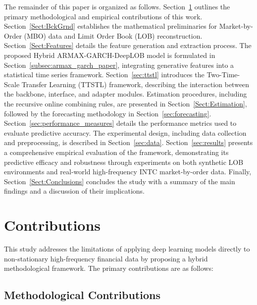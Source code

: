 \documentclass[10pt,a4paper,oneside]{article}
\begin{document}
The remainder of this paper is organized as follows. Section~\ref{Sect:Contributions} outlines the primary methodological and empirical contributions of this work. Section~\ref{Sect:BckGrnd} establishes the mathematical preliminaries for Market-by-Order (MBO) data and Limit Order Book (LOB) reconstruction. Section~\ref{Sect:Features} details the feature generation and extraction process. The proposed Hybrid ARMAX-GARCH-DeepLOB model is formulated in Section~\ref{subsec:armax_garch_paper}, integrating generative features into a statistical time series framework. Section~\ref{sec:ttstl} introduces the Two-Time-Scale Transfer Learning (TTSTL) framework, describing the interaction between the backbone, interface, and adapter modules. Estimation procedures, including the recursive online combining rules, are presented in Section~\ref{Sect:Estimation}, followed by the forecasting methodology in Section~\ref{sec:forecasting}.
Section~\ref{sec:performance_measures} details the performance metrics used to evaluate predictive accuracy.
The experimental design, including data collection and preprocessing, is described in Section~\ref{sec:data}.
Section~\ref{sec:results} presents a comprehensive empirical evaluation of the framework, demonstrating its predictive efficacy and robustness through experiments on both synthetic LOB environments and real-world high-frequency INTC market-by-order data. Finally, Section~\ref{Sect:Conclusions} concludes the study with a summary of the main findings and a discussion of their implications.

\section{Contributions}
\label{Sect:Contributions}

This study addresses the limitations of applying deep learning models directly to non-stationary high-frequency financial data by proposing a hybrid methodological framework. The primary contributions are as follows:

\subsection{Methodological Contributions}
\end{document}

